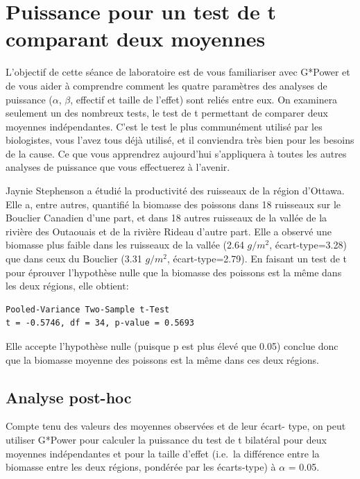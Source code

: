 \documentclass[12pt,]{book}
\begin{document}
\hypertarget{puissance-pour-un-test-de-t-comparant-deux-moyennes}{%
\section{Puissance pour un test de t comparant deux moyennes}\label{puissance-pour-un-test-de-t-comparant-deux-moyennes}}

L'objectif de cette séance de laboratoire est de vous familiariser avec G*Power et de vous aider à comprendre comment les quatre paramètres des analyses de puissance (\(\alpha\), \(\beta\), effectif et taille de l'effet) sont reliés entre eux.
On examinera seulement un des nombreux tests, le test de t permettant de comparer deux moyennes indépendantes.
C'est le test le plus communément utilisé par les biologistes, vous l'avez tous déjà utilisé, et il conviendra très bien pour les besoins de la cause.
Ce que vous apprendrez aujourd'hui s'appliquera à toutes les autres analyses de puissance que vous effectuerez à l'avenir.

Jaynie Stephenson a étudié la productivité des ruisseaux de la région d'Ottawa.
Elle a, entre autres, quantifié la biomasse des poissons dans 18 ruisseaux sur le Bouclier Canadien d'une part, et dans 18 autres ruisseaux de la vallée de la rivière des Outaouais et de la rivière Rideau d'autre part.
Elle a observé une biomasse plus faible dans les ruisseaux de la vallée (2.64 \(g/m^2\), écart-type=3.28) que dans ceux du Bouclier (3.31 \(g/m^2\), écart-type=2.79).
En faisant un test de t pour éprouver l'hypothèse nulle que la biomasse des poissons est la même dans les deux régions, elle obtient:

\begin{verbatim}
Pooled-Variance Two-Sample t-Test
t = -0.5746, df = 34, p-value = 0.5693
\end{verbatim}

Elle accepte l'hypothèse nulle (puisque p est plus élevé que 0.05) conclue donc que la biomasse moyenne des poissons est la même dans ces deux régions.

\hypertarget{analyse-post-hoc}{%
\subsection{Analyse post-hoc}\label{analyse-post-hoc}}

Compte tenu des valeurs des moyennes observées et de leur écart- type, on peut utiliser G*Power pour calculer la puissance du test de t bilatéral pour deux moyennes indépendantes et pour la taille d'effet (i.e.~la différence entre la biomasse entre les deux régions, pondérée par les écarts-type) à \(\alpha\) = 0.05.
\end{document}

